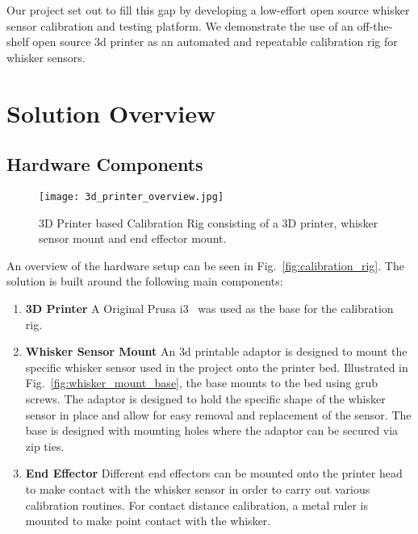 \documentclass[runningheads]{llncs}
\begin{document}
Our project set out to fill this gap by developing a low-effort open source whisker sensor calibration and testing platform. We demonstrate the use of an off-the-shelf open source 3d printer as an automated and repeatable calibration rig for whisker sensors.

\section{Solution Overview}

\subsection{Hardware Components}

\begin{wrapfigure}{r}{0.4\textwidth}
    \centering
    \texttt{[image: 3d\_printer\_overview.jpg]}
    \caption{3D Printer based Calibration Rig consisting of a 3D printer, whisker sensor mount and end effector mount.}
    \vspace{-5pt}
    \label{fig:calibration_rig_overview}
\end{wrapfigure}

An overview of the hardware setup can be seen in Fig.~\ref{fig:calibration_rig}. The solution is built around the following main components:

\begin{enumerate}
    \item \textbf{3D Printer} A Original Prusa i3~\cite{OriginalPrusaI3} was used as the base for the calibration rig.
    \item \textbf{Whisker Sensor Mount} An 3d printable adaptor is designed to mount the specific whisker sensor used in the project onto the printer bed. Illustrated in Fig.~\ref{fig:whisker_mount_base}, the base mounts to the bed using grub screws. The adaptor is designed to hold the specific shape of the whisker sensor in place and allow for easy removal and replacement of the sensor. The base is designed with mounting holes where the adaptor can be secured via zip ties.
    \item \textbf{End Effector} Different end effectors can be mounted onto the printer head to make contact with the whisker sensor in order to carry out various calibration routines. For contact distance calibration, a metal ruler is mounted to make point contact with the whisker.
\end{enumerate}
\end{document}
